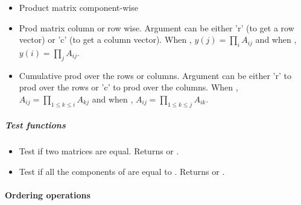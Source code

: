 \begin{itemize}
\item {}
  \sshortdescribe Product matrix component-wise

\item {}
  \sshortdescribe Prod matrix column or row wise. Argument  can be
  either 'r' (to get a row vector) or 'c' (to get a column vector). When
  , $y(j) = \prod_i A_{ij}$ and when , $y(i) = \prod_j
  A_{ij}$.

\item {} 
  \sshortdescribe Cumulative prod over the rows or columns. Argument 
  can be either 'r' to prod over the rows or 'c' to prod over the columns. When
  , $A_{ij} = \prod_{1 \le k \le i} A_{kj}$ and when , 
  $A_{ij} = \prod_{1 \le k \le j} A_{ik}$.
\end{itemize}

\subparagraph{Test functions}

\begin{itemize}
\item {}
  \sshortdescribe Test if two matrices are equal. Returns  or
  .
\item {}
  \sshortdescribe Test if all the components of  are equal to
  . Returns  or .
\end{itemize}


\paragraph{Ordering operations}

